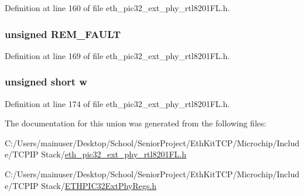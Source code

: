 Definition at line 160 of file eth\+\_\+pic32\+\_\+ext\+\_\+phy\+\_\+rtl8201\+F\+L.\+h.

\hypertarget{union_____a_n_a_dbits__t_acff720284bf641e0b589ea7feb2d3199}{}
\subsubsection[{R\+E\+M\+\_\+\+F\+A\+U\+L\+T}]{\setlength{\rightskip}{0pt plus 5cm}unsigned R\+E\+M\+\_\+\+F\+A\+U\+L\+T}\label{union_____a_n_a_dbits__t_acff720284bf641e0b589ea7feb2d3199}


Definition at line 169 of file eth\+\_\+pic32\+\_\+ext\+\_\+phy\+\_\+rtl8201\+F\+L.\+h.

\hypertarget{union_____a_n_a_dbits__t_a160850a4684a3e82c2323033964f2e98}{}
\subsubsection[{w}]{\setlength{\rightskip}{0pt plus 5cm}unsigned short w}\label{union_____a_n_a_dbits__t_a160850a4684a3e82c2323033964f2e98}


Definition at line 174 of file eth\+\_\+pic32\+\_\+ext\+\_\+phy\+\_\+rtl8201\+F\+L.\+h.



The documentation for this union was generated from the following files\+:\begin{DoxyCompactItemize}
\item 
C\+:/\+Users/mainuser/\+Desktop/\+School/\+Senior\+Project/\+Eth\+Kit\+T\+C\+P/\+Microchip/\+Include/\+T\+C\+P\+I\+P Stack/\hyperlink{eth__pic32__ext__phy__rtl8201_f_l_8h}{eth\+\_\+pic32\+\_\+ext\+\_\+phy\+\_\+rtl8201\+F\+L.\+h}\item 
C\+:/\+Users/mainuser/\+Desktop/\+School/\+Senior\+Project/\+Eth\+Kit\+T\+C\+P/\+Microchip/\+Include/\+T\+C\+P\+I\+P Stack/\hyperlink{_e_t_h_p_i_c32_ext_phy_regs_8h}{E\+T\+H\+P\+I\+C32\+Ext\+Phy\+Regs.\+h}\end{DoxyCompactItemize}
